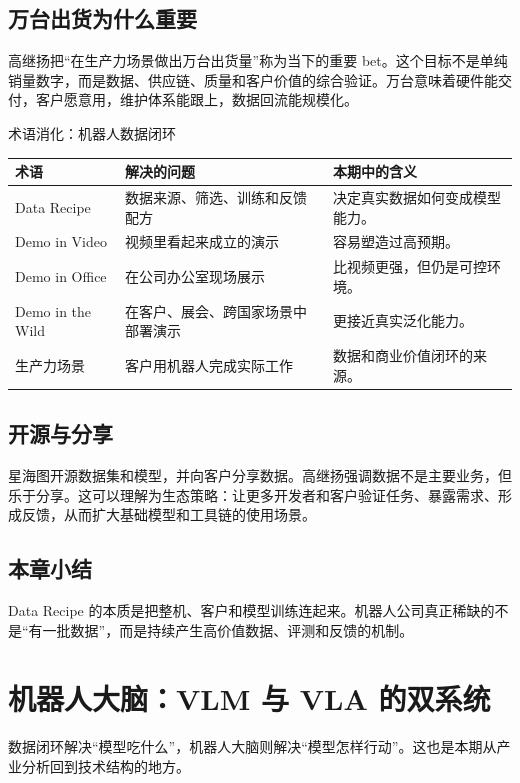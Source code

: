\documentclass[a4paper]{article}
\begin{document}
\subsection{万台出货为什么重要}

高继扬把“在生产力场景做出万台出货量”称为当下的重要 bet。这个目标不是单纯销量数字，而是数据、供应链、质量和客户价值的综合验证。万台意味着硬件能交付，客户愿意用，维护体系能跟上，数据回流能规模化。

\begin{knowledgebox}{术语消化：机器人数据闭环}
\begin{tabularx}{\textwidth}{p{}p{}X}
\toprule
术语 & 解决的问题 & 本期中的含义 \\
\midrule
Data Recipe & 数据来源、筛选、训练和反馈配方 & 决定真实数据如何变成模型能力。 \\
Demo in Video & 视频里看起来成立的演示 & 容易塑造过高预期。 \\
Demo in Office & 在公司办公室现场展示 & 比视频更强，但仍是可控环境。 \\
Demo in the Wild & 在客户、展会、跨国家场景中部署演示 & 更接近真实泛化能力。 \\
生产力场景 & 客户用机器人完成实际工作 & 数据和商业价值闭环的来源。 \\
\bottomrule
\end{tabularx}
\end{knowledgebox}

\subsection{开源与分享}

星海图开源数据集和模型，并向客户分享数据。高继扬强调数据不是主要业务，但乐于分享。这可以理解为生态策略：让更多开发者和客户验证任务、暴露需求、形成反馈，从而扩大基础模型和工具链的使用场景。

\subsection{本章小结}

Data Recipe 的本质是把整机、客户和模型训练连起来。机器人公司真正稀缺的不是“有一批数据”，而是持续产生高价值数据、评测和反馈的机制。

\section{机器人大脑：VLM 与 VLA 的双系统}

数据闭环解决“模型吃什么”，机器人大脑则解决“模型怎样行动”。这也是本期从产业分析回到技术结构的地方。
\end{document}
